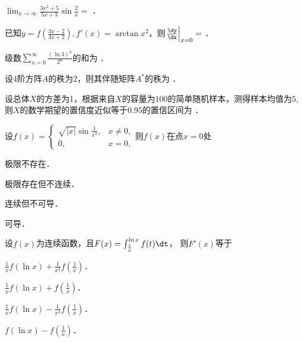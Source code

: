 \documentclass[plain,noanswer,medmath]{../../template/jnuexam}
\begin{document}




\begin{problem}
$\lim_{x \to \infty} \frac{3x^2 + 5}{5x + 3}\sin \frac{2}{x} =$ \fillin{}．
\end{problem}


\begin{problem}
已知$y = f\left(\frac{3x - 2}{3x + 2} \right),f'(x)
= \arctan x^2$，则$\left. \frac{\dy}{\dx} \right|_{x = 0} =$ \fillin{}．
\end{problem}


\begin{problem}
级数$\sum_{n = 0}^{\infty}\frac{(\ln 3)^n}{2^n}$的和为 \fillin{}．
\end{problem}


\begin{problem}
设$4$阶方阵$A$的秩为$2$，则其伴随矩阵$A^*$的秩为 \fillin{}．
\end{problem}


\begin{problem}
设总体$X$的方差为1，根据来自$X$的容量为$100$的简单随机样本，测得样本均值为$5$,
则$X$的数学期望的置信度近似等于$0.95$的置信区间为 \fillin{}．
\end{problem}




\begin{problem}
设$f(x) =$$\begin{cases}
 \sqrt{|x|}\sin\frac{1}{x^2}, & x \ne 0, \\
 0, & x = 0,
\end{cases}$则$f(x)$在点$x=0$处\pickout{}
\begin{abcd}
\item 极限不存在．
\item 极限存在但不连续．
\item 连续但不可导．
\item 可导．
\end{abcd}
\end{problem}


\begin{problem}
设$f(x)$为连续函数，且$F(x) = \int_{\frac{1}{x}}^{\ln x} f(t) \dt$，
则$F'(x)$等于\pickout{}
\begin{abcd}
\item $\frac{1}{x}f\left(\ln x \right) + \frac{1}{x^2}f\left(\frac{1}{x} \right)$．
\item $\frac{1}{x}f\left(\ln x \right) + f\left(\frac{1}{x} \right)$．
\item $\frac{1}{x}f\left(\ln x \right) - \frac{1}{x^2}f\left(\frac{1}{x} \right)$．
\item $f\left(\ln x \right) - f\left(\frac{1}{x} \right)$．
\end{abcd}
\end{problem}
\end{document}
